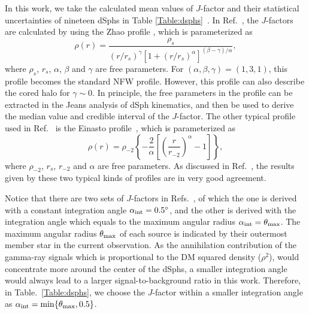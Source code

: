 \documentclass[12pt,aps,prd,amsmath,amssymb,showpacs,floats,floatfix,nofootinbib]{revtex4-1}
\def\red#1{{\textcolor{red}{#1}}} %
\begin{document}
In this work, we take the calculated mean values of $J$-factor and their statistical uncertainties of nineteen dSphs in Table \ref{Table:dsphs}~\cite{Geringer-Sameth:2014yza,Hutten:2016jko}.
In Ref.~\cite{Geringer-Sameth:2014yza}, the $J$-factors are calculated by using the Zhao profile \cite{Hernquist:1990be,Zhao:1995cp}, which is parameterized as\
\begin{equation}
\rho(r)=\frac{\rho_s}{(r/r_s)^\gamma[1+(r/r_s)^\alpha]^{(\beta-\gamma)/\alpha}},
\end{equation}
where $\rho_s$, $r_s$, $\alpha$, $\beta$ and $\gamma$ are free parameters. For $(\alpha, \beta, \gamma)=(1,3,1)$, this profile becomes the standard NFW profile. However, this profile can also describe the cored halo for $\gamma\sim 0$. In principle, the free parameters in the profile can be extracted in the Jeans analysis of dSph kinematics, and then be used to derive the median value and credible interval of the $J$-factor. The other typical profile used in Ref.~\cite{Hutten:2016jko} is the Einasto profile~\cite{Graham:2005xx}, which is parameterized as
\begin{equation}
\rho(r)=\rho_{-2}\left\{ -\frac{2}{\alpha}\left[\left(\frac{r}{r_{-2}}\right)^\alpha-1\right] \right\},
\end{equation}
where $\rho_{-2}$, $r_s$, $r_{-2}$ and $\alpha$ are free parameters. As discussed in Ref.~\cite{Bonnivard:2014kza}, the results given by these two typical kinds of profiles are in very good agreement.

Notice that there are two sets of $J$-factors in Refs.~\cite{Geringer-Sameth:2014yza,Hutten:2016jko}, of which the one is derived with a constant integration angle $\alpha_{\rm int}=0.5^\circ$, and the other is derived with the integration angle which equals to the maximum angular radius $\alpha_{\rm int}=\theta_{\rm max}$. The maximum angular radius $\theta_{\rm max}$  of each source is indicated by their outermost member star in the current observation. As the annihilation contribution of the gamma-ray signals which is proportional to the DM squared density ($\rho^2$), would concentrate more around the center of the dSphs, a smaller integration angle would always lead to a larger signal-to-background ratio in this work.
Therefore, in Table.~\ref{Table:dsphs}, we choose the $J$-factor within a smaller integration angle as $\alpha_{\rm int}=\min\{\theta_{\rm max},0.5\}$.
\end{document}
